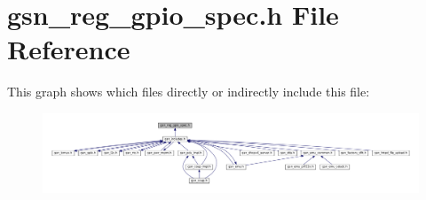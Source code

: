 \hypertarget{a00554}{
\section{gsn\_\-reg\_\-gpio\_\-spec.h File Reference}
\label{a00554}
}
This graph shows which files directly or indirectly include this file:
\nopagebreak
\begin{figure}[H]
\begin{center}
\leavevmode
\includegraphics[width=400pt]{a00790}
\end{center}
\end{figure}
